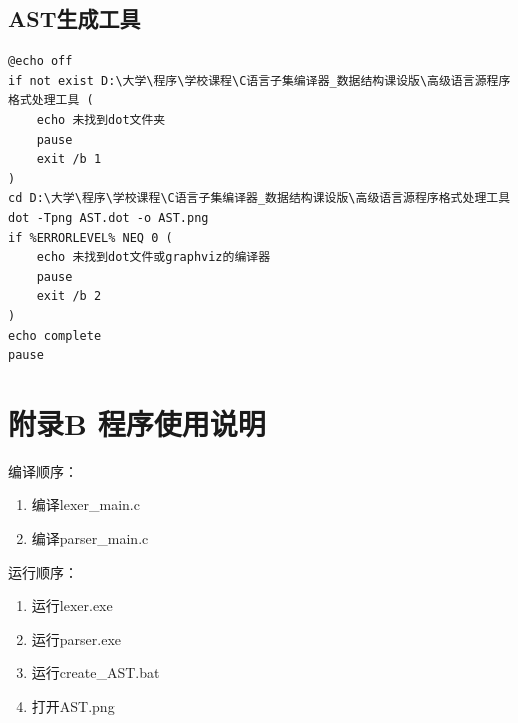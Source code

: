 \documentclass[supercite]{Experimental_Report}
\theoremstyle{definition}
\begin{document}
\subsection{AST生成工具}
\begin{lstlisting}[title=create\_AST,frame=none]
@echo off
if not exist D:\大学\程序\学校课程\C语言子集编译器_数据结构课设版\高级语言源程序格式处理工具 (
    echo 未找到dot文件夹
    pause
    exit /b 1
) 
cd D:\大学\程序\学校课程\C语言子集编译器_数据结构课设版\高级语言源程序格式处理工具
dot -Tpng AST.dot -o AST.png 
if %ERRORLEVEL% NEQ 0 (
    echo 未找到dot文件或graphviz的编译器
    pause
    exit /b 2
)
echo complete
pause
\end{lstlisting}
\newpage
\section{附录B 程序使用说明}
编译顺序：
\begin{enumerate}
	\item 编译lexer\_main.c
	\item 编译parser\_main.c
\end{enumerate}
运行顺序：
\begin{enumerate}
	\item 运行lexer.exe
	\item 运行parser.exe
	\item  运行create\_AST.bat
	\item 打开AST.png
\end{enumerate}
\end{document}

